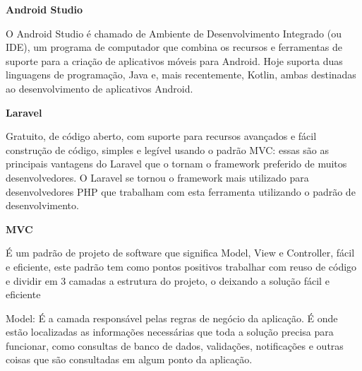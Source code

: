 	\textbf{Android Studio}
	
	O Android Studio é chamado de Ambiente de Desenvolvimento Integrado (ou IDE), um programa de computador que combina os recursos e ferramentas de suporte para a criação de aplicativos móveis para Android. Hoje suporta duas linguagens de programação, Java e, mais recentemente, Kotlin, ambas destinadas ao desenvolvimento de aplicativos Android.
	
	\textbf{Laravel}
	
	Gratuito, de código aberto, com suporte para recursos avançados e fácil construção de código, simples e legível usando o padrão MVC: essas são as principais vantagens do Laravel que o tornam o framework preferido de muitos desenvolvedores. O Laravel se tornou o framework mais utilizado para desenvolvedores PHP que trabalham com esta ferramenta utilizando o padrão de desenvolvimento.%
	
	\textbf{MVC}
	
	É um padrão de projeto de software que significa Model, View e Controller, fácil e eficiente, este padrão tem como pontos positivos trabalhar com reuso de código e dividir em 3 camadas a estrutura do projeto, o deixando a solução fácil e eficiente
	
	Model:  %
	É a camada responsável pelas regras de negócio da aplicação. É onde estão localizadas as informações necessárias que toda a solução precisa para funcionar, como consultas de banco de dados, validações, notificações e outras coisas que são consultadas em algum ponto da aplicação.
	
